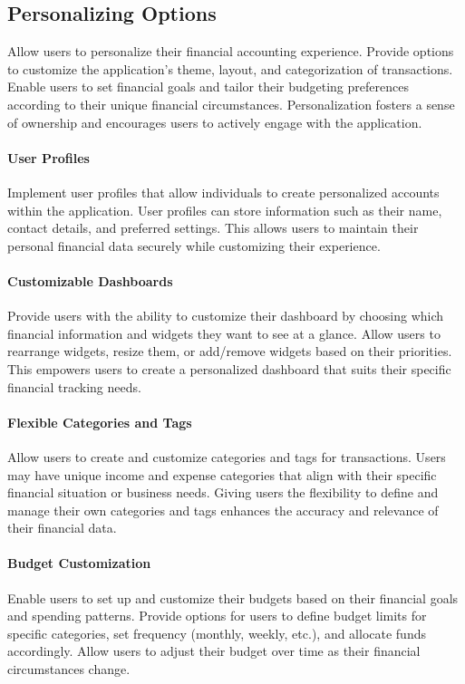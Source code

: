 \subsection{Personalizing Options}

Allow users to personalize their financial accounting experience. Provide options to customize the application's 
theme, layout, and categorization of transactions. Enable users to set financial goals and tailor their budgeting 
preferences according to their unique financial circumstances. Personalization fosters a sense of ownership and 
encourages users to actively engage with the application.

\paragraph{User Profiles}
Implement user profiles that allow individuals to create personalized accounts within the application. User 
profiles can store information such as their name, contact details, and preferred settings. This allows users 
to maintain their personal financial data securely while customizing their experience.

\paragraph{Customizable Dashboards}
Provide users with the ability to customize their dashboard by choosing which financial information and widgets they 
want to see at a glance. Allow users to rearrange widgets, resize them, or add/remove widgets based on their 
priorities. This empowers users to create a personalized dashboard that suits their specific financial tracking needs.

\paragraph{Flexible Categories and Tags}
Allow users to create and customize categories and tags for transactions. Users may have unique income and expense 
categories that align with their specific financial situation or business needs. Giving users the flexibility to 
define and manage their own categories and tags enhances the accuracy and relevance of their financial data.

\paragraph{Budget Customization}
Enable users to set up and customize their budgets based on their financial goals and spending patterns. Provide 
options for users to define budget limits for specific categories, set frequency (monthly, weekly, etc.), and 
allocate funds accordingly. Allow users to adjust their budget over time as their financial circumstances change.

